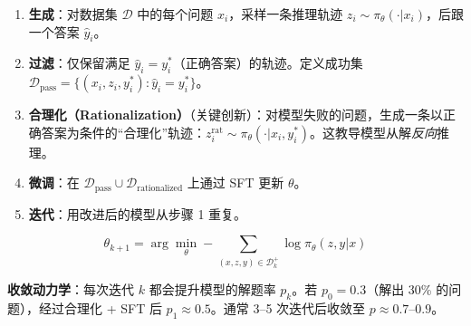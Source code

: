 \begin{enumerate}
  \item \textbf{生成}：对数据集 $\mathcal{D}$ 中的每个问题 $x_i$，采样一条推理轨迹 $z_i \sim \pi_\theta(\cdot | x_i)$，后跟一个答案 $\hat{y}_i$。
  \item \textbf{过滤}：仅保留满足 $\hat{y}_i = y_i^*$（正确答案）的轨迹。定义成功集 $\mathcal{D}_{\text{pass}} = \{(x_i, z_i, y_i^*) : \hat{y}_i = y_i^*\}$。
  \item \textbf{合理化（Rationalization）}（关键创新）：对模型失败的问题，生成一条以正确答案为条件的``合理化''轨迹：$z_i^{\text{rat}} \sim \pi_\theta(\cdot | x_i, y_i^*)$。这教导模型从解\emph{反向}推理。
  \item \textbf{微调}：在 $\mathcal{D}_{\text{pass}} \cup \mathcal{D}_{\text{rationalized}}$ 上通过 SFT 更新 $\theta$。
  \item \textbf{迭代}：用改进后的模型从步骤 1 重复。
\end{enumerate}

\begin{equation}
\boxed{\theta_{k+1} = \arg\min_\theta -\sum_{(x,z,y) \in \mathcal{D}_k^+} \log \pi_\theta(z, y | x)}
\end{equation}

\textbf{收敛动力学}：每次迭代 $k$ 都会提升模型的解题率 $p_k$。若 $p_0 = 0.3$（解出 30\% 的问题），经过合理化 + SFT 后 $p_1 \approx 0.5$。通常 3--5 次迭代后收敛至 $p \approx 0.7$--$0.9$。

